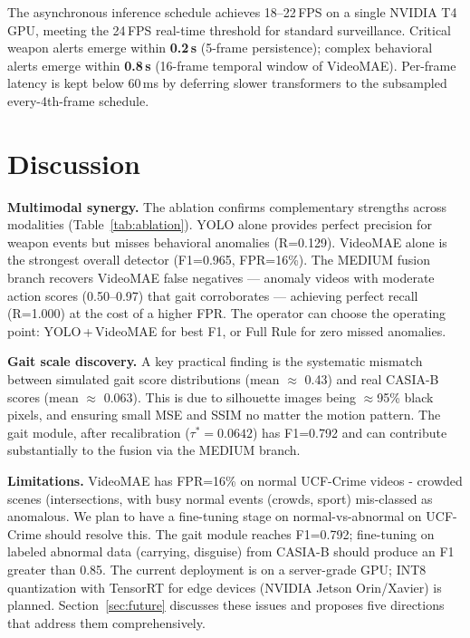 \documentclass[conference]{IEEEtran}
\begin{document}
The asynchronous inference schedule achieves 18--22\,FPS on a single NVIDIA
T4 GPU, meeting the 24\,FPS real-time threshold for standard surveillance.
Critical weapon alerts emerge within \textbf{0.2\,s} (5-frame persistence);
complex behavioral alerts emerge within \textbf{0.8\,s} (16-frame temporal
window of VideoMAE).
Per-frame latency is kept below 60\,ms by deferring slower transformers to
the subsampled every-4th-frame schedule.

\section{Discussion}

\textbf{Multimodal synergy.}
The ablation confirms complementary strengths across modalities
(Table~\ref{tab:ablation}).
YOLO alone provides perfect precision for weapon events but misses
behavioral anomalies (R=0.129).
VideoMAE alone is the strongest overall detector (F1=0.965, FPR=16\%).
The MEDIUM fusion branch recovers VideoMAE false negatives — anomaly
videos with moderate action scores (0.50--0.97) that gait corroborates —
achieving perfect recall (R=1.000) at the cost of a higher FPR.
The operator can choose the operating point: YOLO\,+\,VideoMAE for
best F1, or Full Rule for zero missed anomalies.

\textbf{Gait scale discovery.}
A key practical finding is the systematic mismatch between simulated gait
score distributions (mean $\approx$ 0.43) and real CASIA-B scores
(mean $\approx$ 0.063).
This is due to silhouette images being $\approx$95\% black pixels,
and ensuring small MSE and SSIM no matter the motion pattern.
The gait module, after recalibration ($\tau^*=0.0642$) has F1=0.792
and can contribute substantially to the fusion via the MEDIUM branch.

\textbf{Limitations.}
VideoMAE has FPR=16\% on normal UCF-Crime videos - crowded scenes (intersections,
with busy normal events (crowds, sport) mis-classed as anomalous.
We plan to have a fine-tuning stage on normal-vs-abnormal
on UCF-Crime should resolve this.
The gait module reaches F1=0.792; fine-tuning on labeled abnormal
data (carrying, disguise) from CASIA-B should produce an F1 greater than 0.85.
The current deployment is on a server-grade GPU; INT8 quantization with
TensorRT for edge devices (NVIDIA Jetson Orin/Xavier) is planned.
Section~\ref{sec:future} discusses these issues and proposes
five directions that address them comprehensively.
\end{document}
